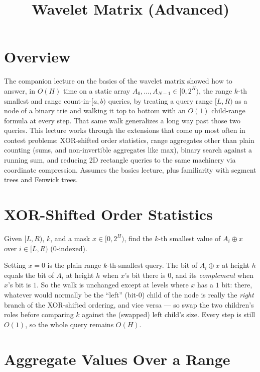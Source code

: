 \documentclass[11pt]{article}
\title{Wavelet Matrix (Advanced)}
\author{}
\date{}
\begin{document}
\thispagestyle{fancy}


\section{Overview}
The companion lecture on the basics of the wavelet matrix showed how to
answer, in $O(H)$ time on a static array $A_0, \ldots, A_{N-1} \in [0,
2^H)$, the range $k$-th smallest and range count-in-$[a,b)$ queries, by
treating a query range $[L, R)$ as a node of a binary trie and walking it
top to bottom with an $O(1)$ child-range formula at every step. That same
walk generalizes a long way past those two queries. This lecture works
through the extensions that come up most often in contest problems:
XOR-shifted order statistics, range aggregates other than plain counting
(sums, and non-invertible aggregates like max), binary search against a
running sum, and reducing 2D rectangle queries to the same machinery via
coordinate compression. Assumes the basics lecture, plus familiarity with
segment trees and Fenwick trees.

\section{XOR-Shifted Order Statistics}

\begin{definitionbox}
Given $[L, R)$, $k$, and a mask $x \in [0, 2^H)$, find the $k$-th smallest
value of $A_i \oplus x$ over $i \in [L, R)$ (0-indexed).
\end{definitionbox}

Setting $x = 0$ is the plain range $k$-th-smallest query. The bit of $A_i
\oplus x$ at height $h$ equals the bit of $A_i$ at height $h$ when $x$'s
bit there is $0$, and its \emph{complement} when $x$'s bit is $1$. So the
walk is unchanged except at levels where $x$ has a $1$ bit: there, whatever
would normally be the ``left'' (bit-$0$) child of the node is really the
\emph{right} branch of the XOR-shifted ordering, and vice versa --- so swap
the two children's roles before comparing $k$ against the (swapped) left
child's size. Every step is still $O(1)$, so the whole query remains
$O(H)$.

\section{Aggregate Values Over a Range}
\end{document}
